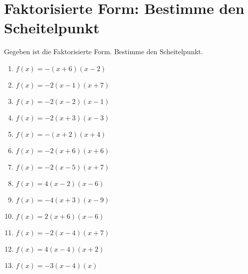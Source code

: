 \documentclass{article}%
\begin{document}
\section{Faktorisierte Form: Bestimme den Scheitelpunkt}%
\label{sec:FaktorisierteFormBestimmedenScheitelpunkt}%
Gegeben ist die Faktorisierte Form. Bestimme den Scheitelpunkt.%
\begin{enumerate}[label=\alph*)]%
\item%
\newline\vspace{0.5cm} $f(x)=-(x+6)(x-2)$%
\item%
\newline\vspace{0.5cm} $f(x)=-2(x-1)(x+7)$%
\item%
\newline\vspace{0.5cm} $f(x)=-2(x-2)(x-1)$%
\item%
\newline\vspace{0.5cm} $f(x)=-2(x+3)(x-3)$%
\item%
\newline\vspace{0.5cm} $f(x)=-(x+2)(x+4)$%
\item%
\newline\vspace{0.5cm} $f(x)=-2(x+6)(x+6)$%
\item%
\newline\vspace{0.5cm} $f(x)=-2(x-5)(x+7)$%
\item%
\newline\vspace{0.5cm} $f(x)=4(x-2)(x-6)$%
\item%
\newline\vspace{0.5cm} $f(x)=-4(x+3)(x-9)$%
\item%
\newline\vspace{0.5cm} $f(x)=2(x+6)(x-6)$%
\item%
\newline\vspace{0.5cm} $f(x)=-2(x-4)(x+7)$%
\item%
\newline\vspace{0.5cm} $f(x)=4(x-4)(x+2)$%
\item%
\newline\vspace{0.5cm} $f(x)=-3(x-4)(x)$%

\end{enumerate}
\end{document}
